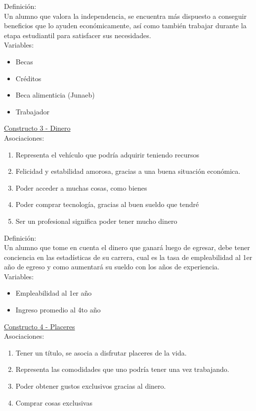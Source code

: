 Definición:\\
Un alumno que valora la independencia, se encuentra más dispuesto a conseguir beneficios que lo ayuden económicamente, así como también trabajar durante la etapa estudiantil para satisfacer sus necesidades.\\

Variables:
\begin{itemize}
	\item Becas
	\item Créditos
	\item Beca alimenticia (Junaeb)
	\item Trabajador
\end{itemize}

\underline {Constructo 3 - Dinero}\\ 
Asociaciones:
\begin{enumerate}
	\item Representa el vehículo que podría adquirir teniendo recursos
	\item Felicidad y estabilidad amorosa, gracias a una buena situación económica.
	\item Poder acceder a muchas cosas, como bienes
	\item Poder comprar tecnología, gracias al buen sueldo que tendré
	\item Ser un profesional significa poder tener mucho dinero
\end{enumerate}

Definición:\\
Un alumno que tome en cuenta el dinero que ganará luego de egresar, debe tener conciencia en las estadísticas de su carrera, cual es la tasa de empleabilidad al 1er año de egreso y como aumentará su sueldo con los años de experiencia.\\

Variables:
\begin{itemize}
	\item Empleabilidad al 1er año
	\item Ingreso promedio al 4to año	
\end{itemize} 

\underline {Constructo 4 - Placeres}\\ 
Asociaciones:
\begin{enumerate}
	\item Tener un título, se asocia a disfrutar placeres de la vida.
	\item Representa las comodidades que uno podría tener una vez trabajando.	
	\item Poder obtener gustos exclusivos gracias al dinero.
	\item Comprar cosas exclusivas
\end{enumerate}

